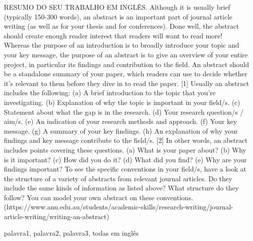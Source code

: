 RESUMO DO SEU TRABALHO EM INGLÊS. Although it is usually brief (typically 150-300 words), an abstract is an important part of journal article writing (as well as for your thesis and for conferences). Done well, the abstract should create enough reader interest that readers will want to read more! 
Whereas the purpose of an introduction is to broadly introduce your topic and your key message, the purpose of an abstract is to give an overview of your entire project, in particular its findings and contribution to the field. An abstract should be a standalone summary of your paper, which readers can use to decide whether it's relevant to them before they dive in to read the paper. 
[1] Usually an abstract includes the following: 
(a) A brief introduction to the topic that you're investigating.
(b) Explanation of why the topic is important in your field/s.
(c) Statement about what the gap is in the research.
(d) Your research question/s / aim/s.
(e) An indication of your research methods and approach.
(f) Your key message.
(g) A summary of your key findings.
(h) An explanation of why your findings and key message contribute to the field/s.
[2]  In other words, an abstract includes points covering these questions.
(a) What is your paper about?
(b) Why is it important?
(c) How did you do it?
(d) What did you find?
(e) Why are your findings important?
To see the specific conventions in your field/s, have a look at the structure of a variety of abstracts from relevant journal articles. Do they include the same kinds of information as listed above? What structure do they follow? You can model your own abstract on these conventions. (https://www.anu.edu.au/students/academic-skills/research-writing/journal-article-writing/writing-an-abstract)

\begin{keywords}
palavra1, palavra2, palavra3, todas em inglês
\end{keywords}